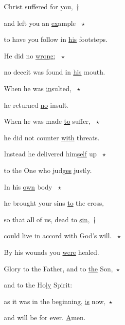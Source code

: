 \noindent Christ suffered for \uline{you},~†~\nopagebreak

and left you an \uline{ex}ample ~$\star$~\nopagebreak

to have you follow in \uline{his} footsteps.

\noindent He did no \uline{wrong}; ~$\star$~\nopagebreak

no deceit was found in \uline{his} mouth.

\noindent When he was \uline{in}sulted, ~$\star$~\nopagebreak

he returned \uline{no} insult.

\noindent When he was made \uline{to} suffer, ~$\star$~\nopagebreak

he did not counter \uline{with} threats.

\noindent Instead he delivered him\uline{self} up ~$\star$~\nopagebreak

to the One who judg\uline{es} justly.

\noindent In his \uline{own} body ~$\star$~\nopagebreak

he brought your sins \uline{to} the cross,

\noindent so that all of us, dead to \uline{sin},~†~\nopagebreak

could live in accord with \uline{God’s} will. ~$\star$~\nopagebreak

By his wounds you \uline{were} healed.

\noindent Glory to the Father, and to \uline{the} Son,~$\star$~\nopagebreak

and to the Ho\uline{ly} Spirit:

\noindent as it was in the beginning, \uline{is} now,~$\star$~\nopagebreak

and will be for ever. \uline{A}men.
